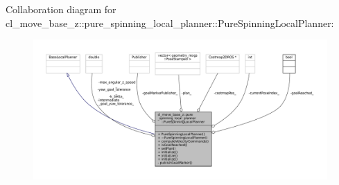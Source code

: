 Collaboration diagram for cl\+\_\+move\+\_\+base\+\_\+z\+:\+:pure\+\_\+spinning\+\_\+local\+\_\+planner\+:\+:Pure\+Spinning\+Local\+Planner\+:
\nopagebreak
\begin{figure}[H]
\begin{center}
\leavevmode
\includegraphics[width=350pt]{classcl__move__base__z_1_1pure__spinning__local__planner_1_1PureSpinningLocalPlanner__coll__graph}
\end{center}
\end{figure}
